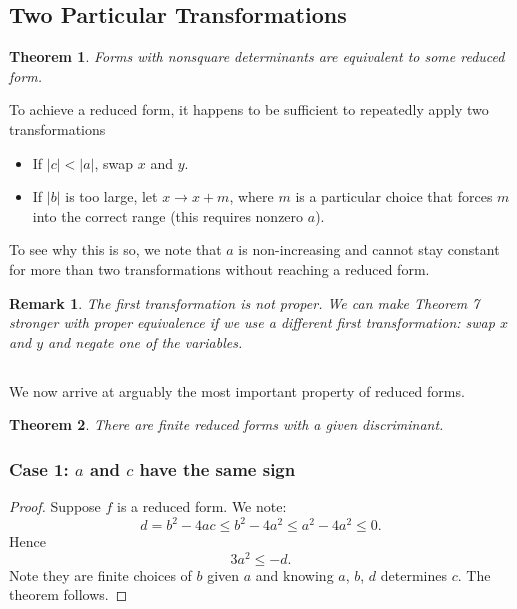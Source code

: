\documentclass[12pt]{article}
\newtheorem{theorem}{Theorem}
\newtheorem*{remark}{Remark}
\begin{document}
\subsection{Two Particular Transformations}
\begin{theorem}
    Forms with nonsquare determinants are equivalent to some reduced form.
\end{theorem}
To achieve a reduced form, it happens to be sufficient to repeatedly apply two transformations
\begin{itemize}
    \item If $|c| < |a|$, swap $x$ and $y$.
    \item If $|b|$ is too large, let $x \longrightarrow x + m$, where $m$ is a particular choice that forces $m$ into the correct range (this requires nonzero $a$).
\end{itemize}
To see why this is so, we note that $a$ is non-increasing and cannot stay constant for more than two transformations without reaching a reduced form.
\begin{remark}
    The first transformation is not proper. We can make Theorem 7 stronger with proper equivalence if we use a different first transformation: swap $x$ and $y$ and negate one of the variables.
\end{remark}

\subsection{}
We now arrive at arguably the most important property of reduced forms.
\begin{theorem}
    There are finite reduced forms with a given discriminant.
\end{theorem}

\subsubsection{Case 1: $a$ and $c$ have the same sign}
\begin{proof}
    Suppose $f$ is a reduced form. We note:
    \begin{equation*}
        d = b^{2} - 4ac \leq b^{2} - 4a^{2} \leq a^{2} - 4a^{2} \leq 0 .
    \end{equation*}
    Hence
    \begin{equation}
        3a^{2} \leq -d.
    \end{equation}
    Note they are finite choices of $b$ given $a$ and knowing $a$, $b$, $d$ determines $c$. The theorem follows. 
\end{proof}
\end{document}
